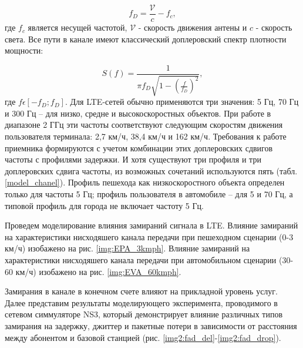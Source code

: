 \begin{equation}\label{eq:maxDeltaF}
f_{D}=\frac{\mathcal{V}}{c}-f_{c},
\end{equation}
\noindent где $f_{c}$ является несущей частотой, $\mathcal{V}$ - скорость движения антены и $c$ - скорость света. Все пути в канале имеют классический доплеровский спектр плотности мощности:

\begin{equation}\label{eq:maxDeltaF}
S(f)=\frac{1}{\pi f_D \sqrt{1-(\frac{f}{f_D})^2}},
\end{equation}
\noindent где $f\epsilon [-f_D;f_D]$. Для LTE-сетей обычно применяются три значения: 5 Гц, 70 Гц и 300 Гц – для низко, средне и высокоскоростных объектов. При работе в диапазоне 2 ГГц эти частоты соответствуют следующим скоростям движения пользователя терминала: 2,7 км/ч, 38,4 км/ч и 162 км/ч. Требования к работе приемника формируются с учетом комбинации этих доплеровских сдвигов частоты с профилями задержки. И хотя существуют три профиля и три доплеровских сдвига частоты, из возможных сочетаний используются пять (табл. \ref{model_chanel}). Профиль пешехода как низкоскоростного объекта определен только для частоты 5 Гц; профиль пользователя в автомобиле – для 5 и 70 Гц, а типовой профиль для города не включает частоту 5 Гц.






Проведем моделирование влияния замираний сигнала в LTE. Влияние замираний на характеристики нисходяшего канала передачи при пешеходном сценарии (0-3 км/ч) изобажено на рис. \ref{img:EPA_3kmph}. Влияние замираний на характеристики нисходяшего канала передачи при автомобильном сценарии (30-60 км/ч) изобажено на рис. \ref{img:EVA_60kmph}.

Замирания в канале в конечном счете влияют на прикладной уровень услуг. Далее представим результаты моделирующего эксперимента, проводимого в сетевом симмуляторе NS3, который демонстрирует влияние различных типов замирания на задержку, джиттер и пакетные потери в зависимости от расстояния между абонентом и базовой станцией (рис. \ref{img2:fad_del}-\ref{img2:fad_drop}).

